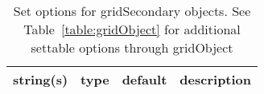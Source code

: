 \begin{table}[ht]
\centering
\begin{tabular}{p{5cm} c c p{7cm}}
\hline
string(s) & type & default & description \\
\hline
\hline
\end{tabular}
\caption{Set options for gridSecondary objects. See Table~\ref{table:gridObject} for additional settable options through gridObject}
\label{table:gridSecondary}
\end{table}

